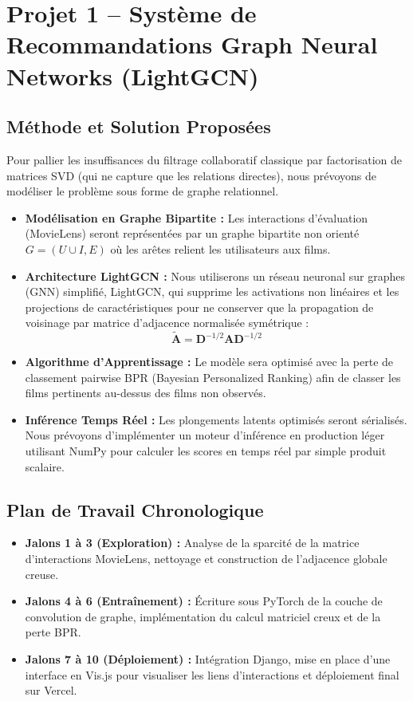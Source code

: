 \documentclass[12pt,a4paper]{article}
\begin{document}
\newpage

\section{Projet 1 -- Système de Recommandations Graph Neural Networks (LightGCN)}

\subsection{Méthode et Solution Proposées}
Pour pallier les insuffisances du filtrage collaboratif classique par factorisation de matrices SVD (qui ne capture que les relations directes), nous prévoyons de modéliser le problème sous forme de graphe relationnel.
\begin{itemize}
    \item \textbf{Modélisation en Graphe Bipartite :} Les interactions d'évaluation (MovieLens) seront représentées par un graphe bipartite non orienté $G = (U \cup I, E)$ où les arêtes relient les utilisateurs aux films.
    \item \textbf{Architecture LightGCN :} Nous utiliserons un réseau neuronal sur graphes (GNN) simplifié, LightGCN, qui supprime les activations non linéaires et les projections de caractéristiques pour ne conserver que la propagation de voisinage par matrice d'adjacence normalisée symétrique :
    \[
    \tilde{\mathbf{A}} = \mathbf{D}^{-1/2} \mathbf{A} \mathbf{D}^{-1/2}
    \]
    \item \textbf{Algorithme d'Apprentissage :} Le modèle sera optimisé avec la perte de classement pairwise BPR (Bayesian Personalized Ranking) afin de classer les films pertinents au-dessus des films non observés.
    \item \textbf{Inférence Temps Réel :} Les plongements latents optimisés seront sérialisés. Nous prévoyons d'implémenter un moteur d'inférence en production léger utilisant NumPy pour calculer les scores en temps réel par simple produit scalaire.
\end{itemize}

\subsection{Plan de Travail Chronologique}
\begin{itemize}
    \item \textbf{Jalons 1 à 3 (Exploration) :} Analyse de la sparcité de la matrice d'interactions MovieLens, nettoyage et construction de l'adjacence globale creuse.
    \item \textbf{Jalons 4 à 6 (Entraînement) :} Écriture sous PyTorch de la couche de convolution de graphe, implémentation du calcul matriciel creux et de la perte BPR.
    \item \textbf{Jalons 7 à 10 (Déploiement) :} Intégration Django, mise en place d'une interface en Vis.js pour visualiser les liens d'interactions et déploiement final sur Vercel.
\end{itemize}
\end{document}
